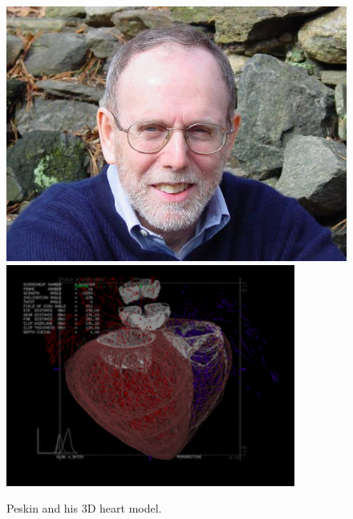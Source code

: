 \documentclass[a4paper,10pt]{article}
\begin{document}
\begin{figure}
\begin{center}
\includegraphics[scale=0.205]{figures/DSC01508_scale4.jpeg}
\hspace{0.1pc}
\includegraphics[scale=0.32]{figures/3D heart.png}
\end{center}
\caption{Peskin and his 3D heart model.}
\label{peskin&heart}
\end{figure}
\end{document}
